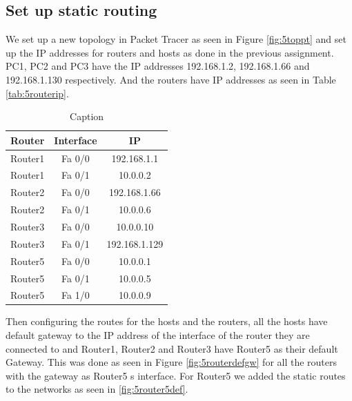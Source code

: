 \documentclass{article}
\begin{document}
\subsection{Set up static routing}

We set up a new topology in Packet Tracer as seen in Figure \ref{fig:5toppt} and set up the IP addresses for routers and hosts as done in the previous assignment. PC1, PC2 and PC3 have the IP addresses 192.168.1.2, 192.168.1.66 and 192.168.1.130 respectively. And the routers have IP addresses as seen in Table \ref{tab:5routerip}. 

\begin{table}[]
    \centering
    \begin{tabular}{c|c|c}
    \hline
         Router & Interface & IP  \\
    \hline
         Router1 & Fa 0/0 &  192.168.1.1\\
         Router1 & Fa 0/1 & 10.0.0.2 \\
         Router2 & Fa 0/0 & 192.168.1.66\\
         Router2 & Fa 0/1 & 10.0.0.6 \\
         Router3 & Fa 0/0 & 10.0.0.10\\
         Router3 & Fa 0/1 & 192.168.1.129\\
         Router5 & Fa 0/0 & 10.0.0.1\\
         Router5 & Fa 0/1 & 10.0.0.5\\
         Router5 & Fa 1/0 & 10.0.0.9\\
         \hline
    \end{tabular}
    \caption{Caption}
    \label{tab:my_label}
\end{table}

Then configuring the routes for the hosts and the routers, all the hosts have default gateway to the IP address of the interface of the router they are connected to and Router1, Router2 and Router3 have Router5 as their default Gateway. This was done as seen in Figure \ref{fig:5routerdefgw} for all the routers with the gateway as Router5
s interface. For Router5 we added the static routes to the networks as seen in \ref{fig:5router5def}.
\end{document}
